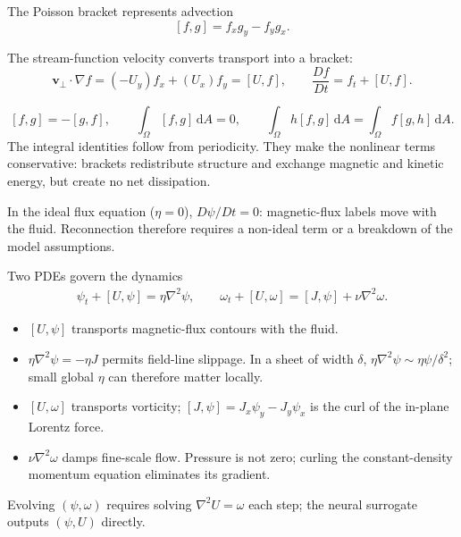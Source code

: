 \documentclass[aspectratio=169,11pt]{beamer}
\newcommand{\bracket}[2]{\left[#1,#2\right]}
\newcommand{\dd}{\,\mathrm{d}}
\newcommand{\vect}[1]{\bm{#1}}
\newcommand{\currentmodule}{Module 1}
\newcommand{\moduleprogress}{1 of 6}
\newcommand{\setmodule}[2]{%
  \renewcommand{\currentmodule}{#1}%
  \renewcommand{\moduleprogress}{#2}%
}
\begin{document}
\setmodule{Module 1}{3 of 6}
\begin{frame}{The Poisson bracket represents advection}
\[
\boxed{\bracket{f}{g}=f_xg_y-f_yg_x.}
\]

The stream-function velocity converts transport into a bracket:
\[
\vect{v}_{\perp}\cdot\nabla f
=(-U_y)f_x+(U_x)f_y
=\bracket{U}{f},
\qquad
\frac{Df}{Dt}=f_t+\bracket{U}{f}.
\]

\[
\bracket{f}{g}=-\bracket{g}{f},
\qquad
\int_{\Omega}\bracket{f}{g}\dd A=0,
\qquad
\int_\Omega h\bracket{f}{g}\dd A
=\int_\Omega f\bracket{g}{h}\dd A.
\]
The integral identities follow from periodicity.  They make the nonlinear terms conservative: brackets redistribute structure and exchange magnetic and kinetic energy, but create no net dissipation.

In the ideal flux equation ($\eta=0$), $D\psi/Dt=0$: magnetic-flux labels move with the fluid.  Reconnection therefore requires a non-ideal term or a breakdown of the model assumptions.
\end{frame}

\setmodule{Module 1}{4 of 6}
\begin{frame}{Two PDEs govern the dynamics}
\begin{align*}
\boxed{\psi_t+\bracket{U}{\psi}=\eta\nabla^2\psi,}
\qquad
\boxed{\omega_t+\bracket{U}{\omega}=\bracket{J}{\psi}+\nu\nabla^2\omega.}
\end{align*}

\begin{itemize}
  \item $\bracket{U}{\psi}$ transports magnetic-flux contours with the fluid.
  \item $\eta\nabla^2\psi=-\eta J$ permits field-line slippage.  In a sheet of width $\delta$, $\eta\nabla^2\psi\sim\eta\psi/\delta^2$; small global $\eta$ can therefore matter locally.
  \item $\bracket{U}{\omega}$ transports vorticity; $\bracket{J}{\psi}=J_x\psi_y-J_y\psi_x$ is the curl of the in-plane Lorentz force.
  \item $\nu\nabla^2\omega$ damps fine-scale flow. Pressure is not zero; curling the constant-density momentum equation eliminates its gradient.
\end{itemize}
Evolving $(\psi,\omega)$ requires solving $\nabla^2U=\omega$ each step; the neural surrogate outputs $(\psi,U)$ directly.
\end{frame}
\end{document}
